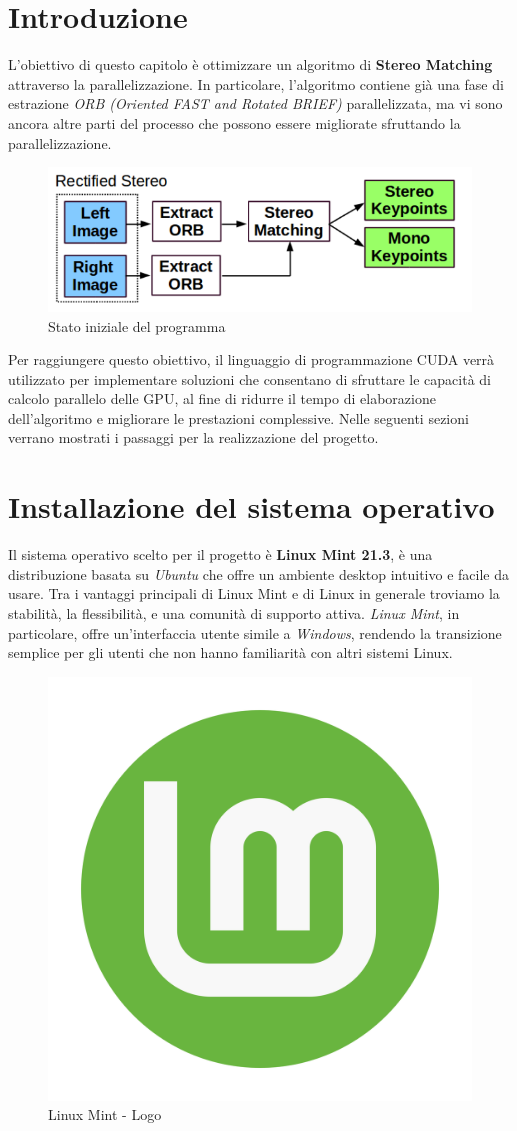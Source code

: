 \documentclass[12pt,a4paper]{report}
\begin{document}
\section{Introduzione}

L'obiettivo di questo capitolo è ottimizzare un algoritmo di \textbf{Stereo Matching} attraverso la parallelizzazione. In particolare, l'algoritmo contiene già una fase di estrazione \textit{ORB (Oriented FAST and Rotated BRIEF)} parallelizzata, ma vi sono ancora altre parti del processo che possono essere migliorate sfruttando la parallelizzazione.

\begin{figure}[h]
    \centering
    \includegraphics[width=0.7\linewidth]{img/start_point_opt.png}
    \caption{Stato iniziale del programma \cite{ORB_SLAM_2}}
\end{figure}


Per raggiungere questo obiettivo, il linguaggio di programmazione CUDA verrà utilizzato per implementare soluzioni che consentano di sfruttare le capacità di calcolo parallelo delle GPU, al fine di ridurre il tempo di elaborazione dell'algoritmo e migliorare le prestazioni complessive.
Nelle seguenti sezioni verrano mostrati i passaggi per la realizzazione del progetto.


\section{Installazione del sistema operativo}

Il sistema operativo scelto per il progetto è \textbf{Linux Mint 21.3}, è una distribuzione basata su \textit{Ubuntu} che offre un ambiente desktop intuitivo e facile da usare. Tra i vantaggi principali di Linux Mint e di Linux in generale troviamo la stabilità, la flessibilità, e una comunità di supporto attiva. \textit{Linux Mint}, in particolare, offre un'interfaccia utente simile a \textit{Windows}, rendendo la transizione semplice per gli utenti che non hanno familiarità con altri sistemi Linux.

\begin{figure}[h]
    \centering
    \includegraphics[width=0.2\linewidth]{img/mint_logo.png}
    \caption{Linux Mint - Logo}
\end{figure}
\end{document}
